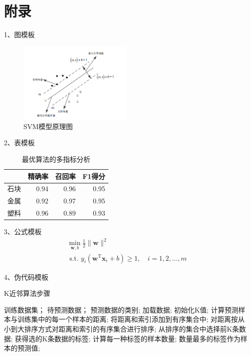 \documentclass{article}
\begin{document}
\section{附录}
\begin{appendices}
1、图模板
\begin{figure}[htpb]               
	\centering
	\includegraphics[width=0.5\textwidth]{svm.png}
	\caption{SVM模型原理图}
	\label{fig:svm}
\end{figure}

2、表模板
\begin{table}[htpb]
\caption{最优算法的多指标分析}
\begin{center}\label{table:score}
\begin{tabular}{|c|r|r|r|}
\hline
   & \multicolumn{1}{c|}{精确率} & \multicolumn{1}{c|}{召回率} & \multicolumn{1}{c|}{F1得分} \\ \hline
石块 & 0.94                     & 0.96                     & 0.95                      \\ \hline
金属 & 0.92                     & 0.97                     & 0.95                      \\ \hline
塑料 & 0.96                     & 0.89                     & 0.93                      \\ \hline
\end{tabular}
\end{center}
\end{table}

3、公式模板
\begin{equation}\label{eq:svmsuper}
\begin{array}{l}
\min _{\boldsymbol{w}, b} \frac{1}{2}\|\boldsymbol{w}\|^{2} \\
\text { s.t. } y_{i}\left(\boldsymbol{w}^{\mathrm{T}} \boldsymbol{x}_{i}+b\right) \geqslant 1, \quad i=1,2, \ldots, m
\end{array}
\end{equation}


4、伪代码模板
 \begin{algorithm}[H]
  \caption{ K近邻算法步骤}
  \begin{algorithmic}[1]
    \Require
      训练数据集；
      待预测数据；
    \Ensure
      预测数据的类别;
    \State 加载数据;
    \State 初始化K值;
    \State 计算预测样本与训练集中的每一个样本的距离;
    \State 将距离和索引添加到有序集合中;
    \State 对距离按从小到大排序方式对距离和索引的有序集合进行排序;
    \State 从排序的集合中选择前K条数据;
    \State 获得选的K条数据的标签;
    \State 计算每一种标签的样本数量;
    \Return 
        数量最多的标签作为样本的预测值;
  \end{algorithmic}
\end{algorithm}



\end{appendices}
\end{document}
